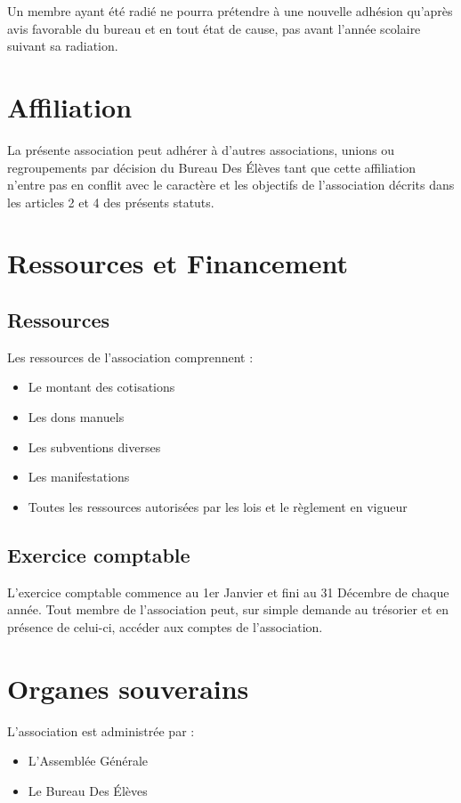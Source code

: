 \documentclass{article} %
\begin{document}
			Un membre ayant été radié ne pourra prétendre à une nouvelle adhésion qu’après avis favorable du
			bureau et en tout état de cause, pas avant l’année scolaire suivant sa radiation.

	\section{Affiliation}
		La présente association peut adhérer à d’autres associations, unions ou regroupements par décision du Bureau Des Élèves
		tant que cette affiliation n’entre pas en conflit avec le caractère et les objectifs de l’association décrits dans
		les articles 2 et 4 des présents statuts.

	\section{Ressources et Financement}
		\subsection{Ressources}
			Les ressources de l’association comprennent :
			\begin{itemize}
				\item Le montant des cotisations
				\item Les dons manuels
				\item Les subventions diverses
				\item Les manifestations
				\item Toutes les ressources autorisées par les lois et le règlement en vigueur
			\end{itemize}

		\subsection{Exercice comptable}
			L’exercice comptable commence au 1er Janvier et fini au 31 Décembre de chaque année.
			Tout membre de l’association peut, sur simple demande au trésorier et en présence de celui-ci, accéder aux comptes de l’association.

	\section{Organes souverains}
		L’association est administrée par :
		\begin{itemize}
			\item L’Assemblée Générale
			\item Le Bureau Des Élèves
		\end{itemize}
\end{document}
